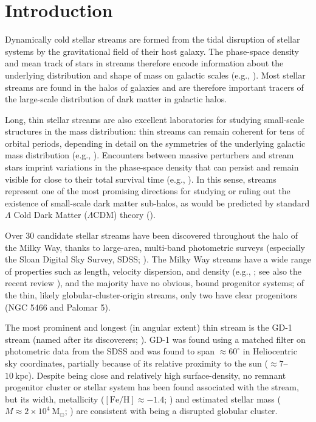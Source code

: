 \documentclass[modern]{aastex62}
\newcommand{\msun}{\textrm{M}_\odot}
\newcommand{\feh}{\ensuremath{[\textrm{Fe} / \textrm{H}]}}
\begin{document}

\section{Introduction}
\label{sec:intro}

Dynamically cold stellar streams are formed from the tidal disruption of stellar
systems by the gravitational field of their host galaxy.
The phase-space density and mean track of stars in streams therefore encode
information about the underlying distribution and shape of mass on galactic
scales (e.g., \citealt{Johnston:1999, Bonaca:2018}).
Most stellar streams are found in the halos of galaxies and are therefore
important tracers of the large-scale distribution of dark matter in galactic
halos.

Long, thin stellar streams are also excellent laboratories for studying
small-scale structures in the mass distribution:
thin streams can remain coherent for tens of orbital periods, depending in
detail on the symmetries of the underlying galactic mass distribution (e.g.,
\citealt{Erkal:2016a}).
Encounters between massive perturbers and stream stars imprint variations in the
phase-space density that can persist and remain visible for close to their total
survival time (e.g., \citealt{Yoon:2011}).
In this sense, streams represent one of the most promising directions for
studying or ruling out the existence of small-scale dark matter sub-halos, as
would be predicted by standard $\Lambda$ Cold Dark Matter ($\Lambda$CDM) theory
(\citealt{Erkal:2015, Sanders:2016, Bovy:2017}).

Over 30 candidate stellar streams have been discovered throughout the halo of
the Milky Way, thanks to large-area, multi-band photometric surveys (especially
the Sloan Digital Sky Survey, SDSS; \citealt{York:2000}).
The Milky Way streams have a wide range of properties such as length, velocity
dispersion, and density (e.g., \citealt{Odenkirchen:2001, Grillmair:2006,
Grillmair:2006b, Belokurov:2006, Belokurov:2007, Bonaca:2012, Shipp:2018}; see
also the recent review \citealt{Grillmair:2016, Newberg:2016}), and the majority
have no obvious, bound progenitor systems;
of the thin, likely globular-cluster-origin streams, only two have clear
progenitors (NGC 5466 and Palomar 5).

The most prominent and longest (in angular extent) thin stream is the GD-1
stream (named after its discoverers; \citealt{Grillmair:2006}).
GD-1 was found using a matched filter on photometric data from the SDSS and
was found to span $\approx 60^\circ$ in Heliocentric sky coordinates, partially
because of its relative proximity to the sun ($\approx 7$--$10~\textrm{kpc}$).
Despite being close and relatively high surface-density, no remnant progenitor
cluster or stellar system has been found associated with the stream, but its
width,  metallicity ($\feh \approx -1.4$; \citealt{Koposov:2010}) and estimated
stellar mass ($M \approx 2 \times 10^4~\msun$; \citealt{Koposov:2010}) are
consistent with being a disrupted globular cluster.
\end{document}
